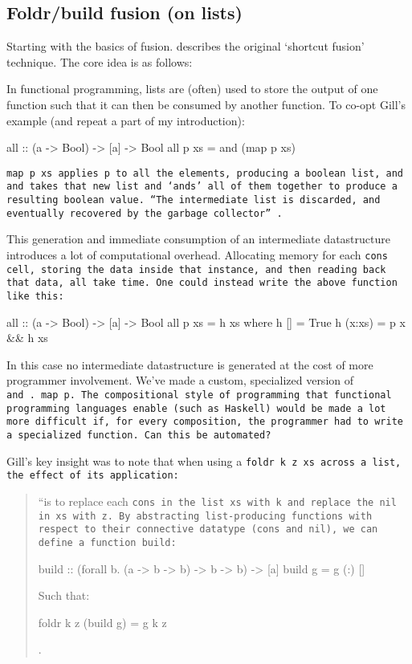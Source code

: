 \subsection{Foldr/build fusion (on lists)}\label{sec:foldr/build}
Starting with the basics of fusion.
\cite{Gill1993} describes the original `shortcut fusion' technique.
The core idea is as follows:

In functional programming, lists are (often) used to store the output of one function such that it can then be consumed by another function. To co-opt Gill's example (and repeat a part of my introduction):
\begin{code}
all :: (a -> Bool) -> [a] -> Bool
all p xs = and (map p xs)
\end{code}

\tt{map p xs} applies \tt{p} to all the elements, producing a boolean list, and \tt{and} takes that new list and `ands' all of them together to produce a resulting boolean value. ``The intermediate list is discarded, and eventually recovered by the garbage collector'' \citep{Gill1993}.

This generation and immediate consumption of an intermediate datastructure introduces a lot of computational overhead. Allocating memory for each \tt{cons} cell, storing the data inside that instance, and then reading back that data, all take time. One could instead write the above function like this:
\begin{code}
all :: (a -> Bool) -> [a] -> Bool
all p xs = h xs
  where h []     = True
        h (x:xs) = p x && h xs
\end{code}
In this case no intermediate datastructure is generated at the cost of more programmer involvement.
We've made a custom, specialized version of \tt{and~.~map~p}.
The compositional style of programming that functional programming languages enable (such as Haskell) would be made a lot more difficult if, for every composition, the programmer had to write a specialized function.
Can this be automated?

Gill's key insight was to note that when using a \tt{foldr k z xs} across a list, the effect of its application: 

\begin{quotation}
    ``is to replace each \tt{cons} in the list \tt{xs} with k and replace the \tt{nil} in \tt{xs} with \tt{z}. By abstracting list-producing functions with respect to their connective datatype (\tt{cons} and \tt{nil}), we can define a function \tt{build}:
\begin{code}
build :: (forall b. (a -> b -> b) -> b -> b) -> [a] 
build g = g (:) []
\end{code}
Such that:
\begin{code}
foldr k z (build g) = g k z
\end{code}
\cite{Gill1993}.
\end{quotation}

